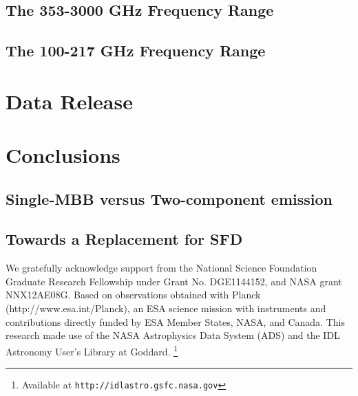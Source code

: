 \documentclass{emulateapj}
\begin{document}
\subsection{The 353-3000 GHz Frequency Range}
\label{sec:hifreq}

\subsection{The 100-217 GHz Frequency Range}
\label{sec:lofreq}

\section{Data Release}
\label{sec:release}

\section{Conclusions}
\label{sec:conclusion}

\subsection{Single-MBB versus Two-component emission}

\subsection{Towards a Replacement for SFD}
\label{sec:replace}

We gratefully acknowledge support from the National Science Foundation Graduate
Research Fellowship under Grant No. DGE1144152, and NASA grant NNX12AE08G. 
Based on observations obtained with Planck (http://www.esa.int/Planck), an ESA 
science mission with instruments and contributions directly funded by ESA 
Member States, NASA, and Canada. This research made use of the NASA 
Astrophysics Data System (ADS) and the IDL Astronomy User's Library at Goddard.
\footnote{Available at \texttt{http://idlastro.gsfc.nasa.gov}}
\end{document}
